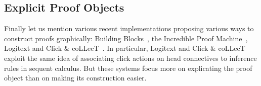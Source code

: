 

\subsection*{Explicit Proof Objects}

Finally let us mention various recent implementations proposing various ways to
construct proofs graphically: Building Blocks~, the
Incredible Proof Machine~,
Logitext and Click \&
coLLecT~\cite{clickcollect}. In particular, Logitext and Click \& coLLecT
exploit the same idea of associating click actions on head connectives to
inference rules in sequent calculus. But these systems focus more on explicating
the proof object than on making its construction easier.